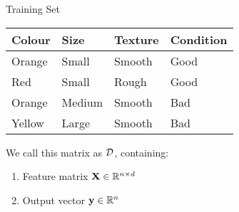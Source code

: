 \documentclass{beamer}
\begin{document}
\begin{frame}{Training Set}
\vspace{-5pt}
\begin{table}[]
	\begin{tabular}{|l|l|l||l|}
		\hline 
		\rowcolor{white}
		\textbf{Colour} & \textbf{Size} & \textbf{Texture} & \textbf{Condition} \\ \hline 
		Orange & Small & Smooth  & Good      \\
		Red    & Small  & Rough  & Good \\
		Orange & Medium & Smooth & Bad \\
		Yellow & Large  & Smooth & Bad \\ \hline 
	\end{tabular}
\end{table}

\pause
We call this matrix as $\mathcal{D}$, containing:
\begin{enumerate}
	\item Feature matrix $\mathbf{X} \in \mathbb{R}^{n \times d}$
	\item Output vector $\mathbf{y} \in \mathbb{R}^n$
\end{enumerate}
\end{frame}
\end{document}
